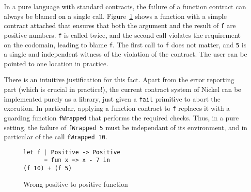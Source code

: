 \documentclass[sigplan,10pt,review,anonymous]{acmart}
\newcommand{\nickel}[1]{\lstinline[language=nickel]{#1}}
\begin{document}
In a pure language with standard contracts, the failure of a function contract
can always be blamed on a single call. Figure~\ref{fig:pos-to-pos} shows a
function with a simple contract attached that ensures that both the argument and
the result of \nickel{f} are positive numbers. \nickel{f} is called twice, and
the second call violates the requirement on the codomain, leading to blame
\nickel{f}. The first call to \nickel{f} does not matter, and \nickel{5} is a
single and independent witness of the violation of the contract. The user can be
pointed to one location in practice.

There is an intuitive justification for this fact. Apart from the error
reporting part (which is crucial in practice!), the current contract system of
Nickel can be implemented purely as a library, just given a \nickel{fail}
primitive to abort the execution. In particular, applying a function contract to
\nickel{f} replaces it with a guarding function \nickel{fWrapped} that performs
the required checks. Thus, in a pure setting, the failure of \nickel{fWrapped 5}
must be independant of its environment, and in particular of the call
\nickel{fWrapped 10}.

%

\begin{figure}[h]
\begin{lstlisting}[language=nickel]
let f | Positive -> Positive
      = fun x => x - 7 in
(f 10) + (f 5)
\end{lstlisting}
\caption{Wrong positive to positive function}
\label{fig:pos-to-pos}
\end{figure}

%
\end{document}
